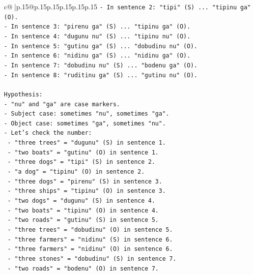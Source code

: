 \documentclass{article}
\begin{document}
{\begin{supertabular}{c@{$\;$}|p{.15\linewidth}@{}p{.15\linewidth}p{.15\linewidth}p{.15\linewidth}p{.15\linewidth}p{.15\linewidth}}
{{{\texttt{{-} In sentence 2: "tipi" (S) ... "tipinu ga" (O).} \\
\texttt{{-} In sentence 3: "pirenu ga" (S) ... "tipinu ga" (O).} \\
\texttt{{-} In sentence 4: "dugunu nu" (S) ... "tipinu nu" (O).} \\
\texttt{{-} In sentence 5: "gutinu ga" (S) ... "dobudinu nu" (O).} \\
\texttt{{-} In sentence 6: "nidinu ga" (S) ... "nidinu ga" (O).} \\
\texttt{{-} In sentence 7: "dobudinu nu" (S) ... "bodenu ga" (O).} \\
\texttt{{-} In sentence 8: "ruditinu ga" (S) ... "gutinu nu" (O).} \\
\\ 
\texttt{Hypothesis:} \\
\texttt{{-} "nu" and "ga" are case markers.} \\
\texttt{{-} Subject case: sometimes "nu", sometimes "ga".} \\
\texttt{{-} Object case: sometimes "ga", sometimes "nu".} \\
\texttt{{-} Let's check the number:} \\
\texttt{  {-} "three trees" = "dugunu" (S) in sentence 1.} \\
\texttt{  {-} "two boats" = "gutinu" (O) in sentence 1.} \\
\texttt{  {-} "three dogs" = "tipi" (S) in sentence 2.} \\
\texttt{  {-} "a dog" = "tipinu" (O) in sentence 2.} \\
\texttt{  {-} "three dogs" = "pirenu" (S) in sentence 3.} \\
\texttt{  {-} "three ships" = "tipinu" (O) in sentence 3.} \\
\texttt{  {-} "two dogs" = "dugunu" (S) in sentence 4.} \\
\texttt{  {-} "two boats" = "tipinu" (O) in sentence 4.} \\
\texttt{  {-} "two roads" = "gutinu" (S) in sentence 5.} \\
\texttt{  {-} "three trees" = "dobudinu" (O) in sentence 5.} \\
\texttt{  {-} "three farmers" = "nidinu" (S) in sentence 6.} \\
\texttt{  {-} "three farmers" = "nidinu" (O) in sentence 6.} \\
\texttt{  {-} "three stones" = "dobudinu" (S) in sentence 7.} \\
\texttt{  {-} "two roads" = "bodenu" (O) in sentence 7.} \\
}}}
\end{supertabular}}
\end{document}

